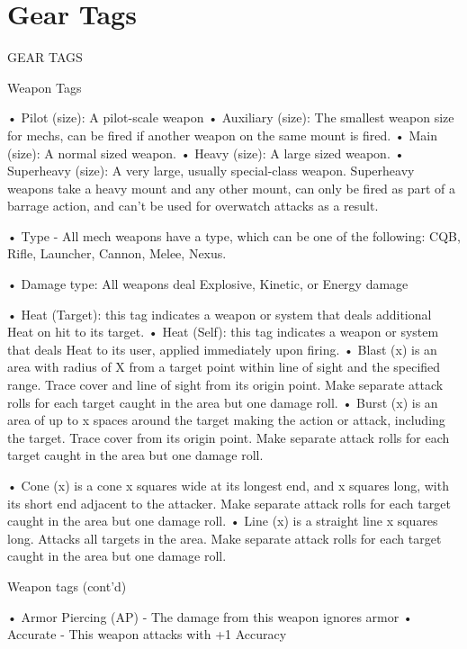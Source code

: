 \chapter{Gear Tags}

      GEAR TAGS

Weapon Tags

•  \hypertarget{Pilot}{Pilot (size)}: A pilot-scale weapon
•  \hypertarget{Auxiliary}{Auxiliary (size)}: The smallest weapon size for mechs, can be fired if another weapon on the
  same mount is fired.
•  \hypertarget{Main}{Main (size)}: A normal sized weapon.
•  \hypertarget{Heavy}{Heavy (size)}: A large sized weapon.
•  \hypertarget{Superheavy}{Superheavy (size)}: A very large, usually special-class weapon. Superheavy weapons take a
  heavy mount and any other mount, can only be fired as part of a barrage action, and can’t be
  used for overwatch attacks as a result.

•  \hypertarget{Type}{Type} - All mech weapons have a type, which can be one of the following: CQB, Rifle,
  Launcher, Cannon, Melee, Nexus.

•  \hypertarget{DamageType}{Damage type}: All weapons deal Explosive, Kinetic, or Energy damage


•  \hypertarget{HeatTarget}{Heat (Target)}: this tag indicates a weapon or system that deals additional Heat on hit to its
  target.
•  Heat (Self): this tag indicates a weapon or system that deals Heat to its user, applied
  immediately upon firing.
•  \hypertarget{Blast}{Blast (x)} is an area with radius of X from a target point within line of sight and the specified
  range. Trace cover and line of sight from its origin point. Make separate attack rolls for each
  target caught in the area but one damage roll.
•  \hypertarget{Burst}{Burst (x)} is an area of up to x spaces around the target making the action or attack, including
  the target. Trace cover from its origin point. Make separate attack rolls for each target caught in
  the area but one damage roll.

•  \hypertarget{Cone}{Cone (x)} is a cone x squares wide at its longest end, and x squares long, with its short end
  adjacent to the attacker. Make separate attack rolls for each target caught in the area but one
  damage roll.
•  \hypertarget{Line}{Line (x)} is a straight line x squares long. Attacks all targets in the area. Make separate attack
  rolls for each target caught in the area but one damage roll.

Weapon tags (cont’d)

•  \hypertarget{AP}{Armor Piercing (AP)} - The damage from this weapon ignores armor
•  \hypertarget{Accurate}{Accurate} - This weapon attacks with +1 Accuracy

